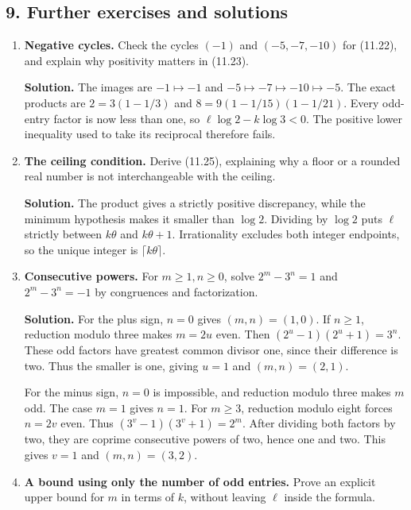 \documentclass[
  11pt,
  a4paper,
]{article}
\begin{document}
\subsection{9. Further exercises and
solutions}\label{further-exercises-and-solutions}

\begin{enumerate}
\def\labelenumi{\arabic{enumi}.}
\setcounter{enumi}{4}
\item
  \textbf{Negative cycles.} Check the cycles \((-1)\) and
  \((-5,-7,-10)\) for (11.22), and explain why positivity matters in
  (11.23).

  \textbf{Solution.} The images are \(-1\mapsto-1\) and
  \(-5\mapsto-7\mapsto-10\mapsto-5\). The exact products are
  \(2=3(1-1/3)\) and \(8=9(1-1/15)(1-1/21)\). Every odd-entry factor is
  now less than one, so \(\ell\log2-k\log3<0\). The positive lower
  inequality used to take its reciprocal therefore fails.
\item
  \textbf{The ceiling condition.} Derive (11.25), explaining why a floor
  or a rounded real number is not interchangeable with the ceiling.

  \textbf{Solution.} The product gives a strictly positive discrepancy,
  while the minimum hypothesis makes it smaller than \(\log2\). Dividing
  by \(\log2\) puts \(\ell\) strictly between \(k\theta\) and
  \(k\theta+1\). Irrationality excludes both integer endpoints, so the
  unique integer is \(\lceil k\theta\rceil\).
\item
  \textbf{Consecutive powers.} For \(m\ge1,n\ge0\), solve \(2^m-3^n=1\)
  and \(2^m-3^n=-1\) by congruences and factorization.

  \textbf{Solution.} For the plus sign, \(n=0\) gives \((m,n)=(1,0)\).
  If \(n\ge1\), reduction modulo three makes \(m=2u\) even. Then
  \((2^u-1)(2^u+1)=3^n\). These odd factors have greatest common divisor
  one, since their difference is two. Thus the smaller is one, giving
  \(u=1\) and \((m,n)=(2,1)\).

  For the minus sign, \(n=0\) is impossible, and reduction modulo three
  makes \(m\) odd. The case \(m=1\) gives \(n=1\). For \(m\ge3\),
  reduction modulo eight forces \(n=2v\) even. Thus
  \((3^v-1)(3^v+1)=2^m\). After dividing both factors by two, they are
  coprime consecutive powers of two, hence one and two. This gives
  \(v=1\) and \((m,n)=(3,2)\).
\item
  \textbf{A bound using only the number of odd entries.} Prove an
  explicit upper bound for \(m\) in terms of \(k\), without leaving
  \(\ell\) inside the formula.


\end{enumerate}
\end{document}
